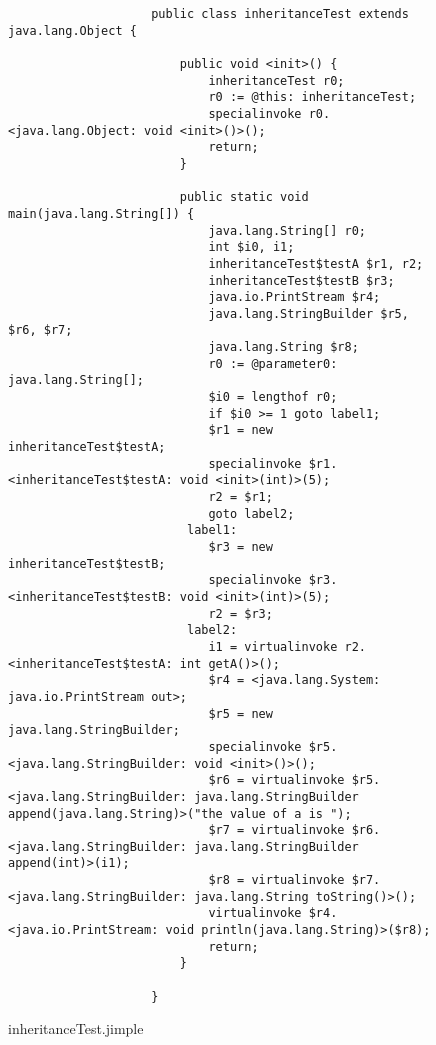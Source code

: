 \documentclass{dithesis}
\begin{document}
            \begin{figure}[H]
                \begin{lstlisting}
                    public class inheritanceTest extends java.lang.Object {

                        public void <init>() {
                            inheritanceTest r0;
                            r0 := @this: inheritanceTest;
                            specialinvoke r0.<java.lang.Object: void <init>()>();
                            return;
                        }

                        public static void main(java.lang.String[]) {
                            java.lang.String[] r0;
                            int $i0, i1;
                            inheritanceTest$testA $r1, r2;
                            inheritanceTest$testB $r3;
                            java.io.PrintStream $r4;
                            java.lang.StringBuilder $r5, $r6, $r7;
                            java.lang.String $r8;
                            r0 := @parameter0: java.lang.String[];
                            $i0 = lengthof r0;
                            if $i0 >= 1 goto label1;
                            $r1 = new inheritanceTest$testA;
                            specialinvoke $r1.<inheritanceTest$testA: void <init>(int)>(5);
                            r2 = $r1;
                            goto label2;
                         label1:
                            $r3 = new inheritanceTest$testB;
                            specialinvoke $r3.<inheritanceTest$testB: void <init>(int)>(5);
                            r2 = $r3;
                         label2:
                            i1 = virtualinvoke r2.<inheritanceTest$testA: int getA()>();
                            $r4 = <java.lang.System: java.io.PrintStream out>;
                            $r5 = new java.lang.StringBuilder;
                            specialinvoke $r5.<java.lang.StringBuilder: void <init>()>();
                            $r6 = virtualinvoke $r5.<java.lang.StringBuilder: java.lang.StringBuilder append(java.lang.String)>("the value of a is ");
                            $r7 = virtualinvoke $r6.<java.lang.StringBuilder: java.lang.StringBuilder append(int)>(i1);
                            $r8 = virtualinvoke $r7.<java.lang.StringBuilder: java.lang.String toString()>();
                            virtualinvoke $r4.<java.io.PrintStream: void println(java.lang.String)>($r8);
                            return;
                        }

                    }
                \end{lstlisting}
            \caption{inheritanceTest.jimple}
            \end{figure}
\end{document}
